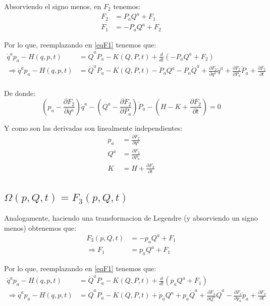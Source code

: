\documentclass[12pt]{report}
\begin{document}
Absorviendo el signo menos, en $F_{2}$ tenemos:
	\begin{align*}
		F_{2} &= P_{a}Q^{a} + F_{1} \\
		F_{1} &= -P_{a}Q^{a} + F_{2} 
	\end{align*}

Por lo que, reemplazando en \eqref{eqF1} tenemos que:
	\begin{align*}
		\dot{q}^{a}p_{a} - H(q,p,t) &=  \dot{Q}^{a}P_{a} - K(Q,P,t)  + \frac{d}{dt} \left( -P_{a}Q^{a} + F_{2} \right) \\ \label{eqF1}
\Rightarrow \dot{q}^{a}p_{a} - H(q,p,t) &=  \dot{Q}^{a}P_{a} - K(Q,P,t)  - \dot{P}_{a}Q^{a} - P_{a}\dot{Q}^{a}
										   +\frac{\partial F_{2}}{\partial q^{a}}\dot{q}^{a} 
										   +\frac{\partial F_{2}}{\partial P_{a}}\dot{P}_{a} + \frac{\partial F_{2}}{\partial t}\\
	\end{align*}
	
De donde:
	\begin{equation*}
		\left(p_{a} - \frac{\partial F_{2}}{\partial q^{a}} \right)\dot{q}^{a}
	   -\left( Q^{a} -\frac{\partial F_{2}}{\partial P_{a}} \right)\dot{P}_{a}
	   - \left(H - K + \frac{\partial F_{2}}{\partial t}\right)  = 0
	\end{equation*}

Y como son las derivadas son linealmente independientes:
	\begin{align*}
		p_{a} &= \frac{\partial F_{2}}{\partial q^{a}}\\
		Q^{a} &= \frac{\partial F_{2}}{\partial P_{a}} \\
		K &= H + \frac{\partial F_{2}}{\partial t}
	\end{align*}

\subsection{$\Omega(p,Q,t) = F_{3}(p,Q,t)$}

Analogamente, haciendo una transformacion de Legendre (y absorviendo un signo menos) obtenemos que:
	\begin{align*}
		F_{3}(p,Q,t) &= -p_{a}Q^{a} + F_{1} \\
		\Rightarrow F_{1} &= p_{a}Q^{a} + F_{1}
	\end{align*}
	
Por lo que, reemplazando en \eqref{eqF1} tenemos que:
	\begin{align*}
		\dot{q}^{a}p_{a} - H(q,p,t) &=  \dot{Q}^{a}P_{a} - K(Q,P,t)  + \frac{d}{dt} \left( p_{a}Q^{a} + F_{1} \right) \\ \label{eqF1}
\Rightarrow \dot{q}^{a}p_{a} - H(q,p,t) &=  \dot{Q}^{a}P_{a} - K(Q,P,t)  + \dot{p}_{a}Q^{a} + p_{a}\dot{Q}^{a}
										   +\frac{\partial F_{3}}{\partial Q^{a}}\dot{Q}^{a} 
										   -\frac{\partial F_{3}}{\partial p_{a}}\dot{p}_{a} + \frac{\partial F_{3}}{\partial t}\\
	\end{align*}
	
\end{document}
